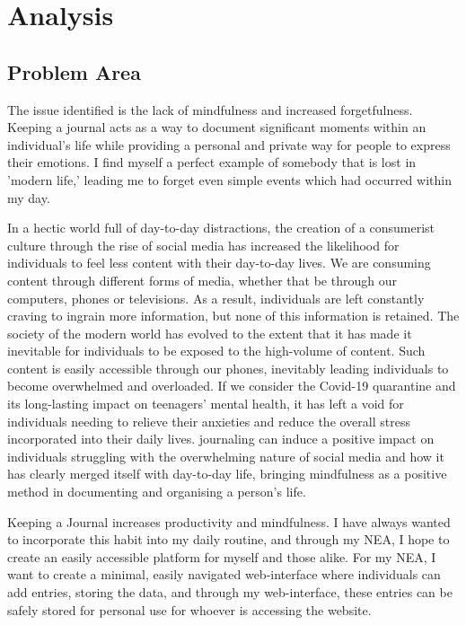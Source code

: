 \chapter{Analysis}


\section{Problem Area}

The issue identified is the lack of mindfulness and increased forgetfulness. Keeping a journal acts as a way to document significant moments within an individual's life while providing a personal and private way for people to express their emotions. I find myself a perfect example of somebody that is lost in 'modern life,' leading me to forget even simple events which had occurred within my day. 

In a hectic world full of day-to-day distractions, the creation of a consumerist culture through the rise of social media has increased the likelihood for individuals to feel less content with their day-to-day lives. We are consuming content through different forms of media, whether that be through our computers, phones or televisions. As a result, individuals are left constantly craving to ingrain more information, but none of this information is retained. The society of the modern world has evolved to the extent that it has made it inevitable for individuals to be exposed to the high-volume of content. Such content is easily accessible through our phones,  inevitably leading individuals to become overwhelmed and overloaded. If we consider the Covid-19 quarantine and its long-lasting impact on teenagers' mental health, \cite{Imran_Aamer_Sharif_Bodla_Naveed_2020} it has left a void for individuals needing to relieve their anxieties and reduce the overall stress incorporated into their daily lives. journaling can induce a positive impact on individuals struggling with the overwhelming nature of social media and how it has clearly merged itself with day-to-day life, bringing mindfulness as a positive method in documenting and organising a person's life. 


Keeping a Journal increases productivity and mindfulness. I have always wanted to incorporate this habit into my daily routine, and through my NEA, I hope to create an easily accessible platform for myself and those alike. For my NEA, I want to create a minimal, easily navigated web-interface where individuals can add entries, storing the data, and through my web-interface, these entries can be safely stored for personal use for whoever is accessing the website. 

